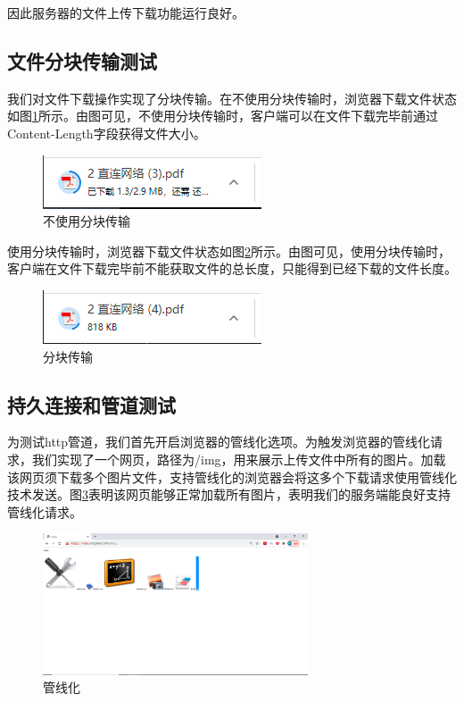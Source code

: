 \documentclass[a4paper]{article}
\begin{document}
因此服务器的文件上传下载功能运行良好。

\subsection{文件分块传输测试}

我们对文件下载操作实现了分块传输。在不使用分块传输时，浏览器下载文件状态如图\ref{nochunk}所示。由图可见，不使用分块传输时，客户端可以在文件下载完毕前通过Content-Length字段获得文件大小。
\begin{figure}[!h]
\begin{center}
\includegraphics[scale=0.8]{figs/nochunk.PNG}
\end{center}
\caption{不使用分块传输}
\label{nochunk}
\end{figure}

使用分块传输时，浏览器下载文件状态如图\ref{chunk}所示。由图可见，使用分块传输时，客户端在文件下载完毕前不能获取文件的总长度，只能得到已经下载的文件长度。

\begin{figure}[!h]
\begin{center}
\includegraphics[scale=0.8]{figs/chunk.PNG}
\end{center}
\caption{分块传输}
\label{chunk}
\end{figure}

\subsection{持久连接和管道测试}
为测试http管道，我们首先开启浏览器的管线化选项。为触发浏览器的管线化请求，我们实现了一个网页，路径为/img，用来展示上传文件中所有的图片。加载该网页须下载多个图片文件，支持管线化的浏览器会将这多个下载请求使用管线化技术发送。图\ref{pipeline}表明该网页能够正常加载所有图片，表明我们的服务端能良好支持管线化请求。

\begin{figure}[!h]
\begin{center}
\includegraphics[width=0.7\textwidth]{figs/pipeline.PNG}
\end{center}
\caption{管线化}
\label{pipeline}
\end{figure}
\end{document}
